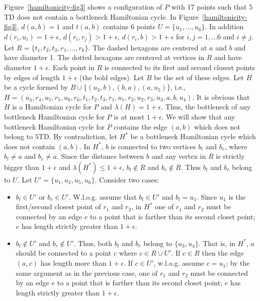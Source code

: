 \documentclass[11pt,a4paper]{article}
\newcommand{\kTD}[2]{$#1$\text{-}TD#2}
\begin{document}
Figure~\ref{hamiltonicity-fig3} shows a configuration of $P$ with 17 points such that \kTD{5}{} does not contain a bottleneck Hamiltonian cycle. In Figure~\ref{hamiltonicity-fig3}, $d(a,b)=1$ and $t(a,b)$ contains 6 points $U=\{u_1, \dots, u_6\}$. In addition $d(r_i, u_i)= 1+\epsilon$, $d(r_i, r_j)>1+\epsilon$, $d(r_i, b)> 1+\epsilon$ for $i,j=1,\dots 6$ and $i\neq j$. Let $R=\{t_1, t_2,t_3, r_1,\dots, r_6\}$. The dashed hexagons are centered at $a$ and $b$ and have diameter 1. The dotted hexagons are centered at vertices in $R$ and have diameter $1+\epsilon$. Each point in $R$ is connected to its first and second closest points by edges of length $1+\epsilon$ (the bold edges). Let $B$ be the set of these edges. Let $H$ be a cycle formed by $B\cup\{(u_3,b),(b,a),(a,u_5)\}$, i.e., $H=(u_4,r_4,u_5,r_5,u_6,r_6,t_1,t_2,t_3,r_1,u_1,r_2,u_2,r_3,u_3,a,b,u_4)$. It is obvious that $H$ is a Hamiltonian cycle for $P$ and $\lambda(H)=1+\epsilon$. Thus, the bottleneck of any bottleneck Hamiltonian cycle for $P$ is at most $1+\epsilon$. We will show that any bottleneck Hamiltonian cycle for $P$ contains the edge $(a,b)$ which does not belong to \kTD{5}{}. By contradiction, let $H^*$ be a bottleneck Hamiltonian cycle which does not contain $(a,b)$. In $H^*$, $b$ is connected to two vertices $b_l$ and $b_r$, where $b_l\neq a$ and $b_r\neq a$. Since the distance between $b$ and any vertex in $R$ is strictly bigger than $1+\epsilon$ and $\lambda(H^*)\le 1+\epsilon$, $b_l\notin R$ and $b_r\notin R$. Thus $b_l$ and $b_r$ belong to $U$. Let $U'=\{u_1,u_2,u_5,u_6\}$. Consider two cases:

\begin{itemize}
 \item $b_l\in U'$ or $b_r\in U'$. W.l.o.g. assume that $b_l\in U'$ and $b_l=u_1$. Since $u_1$ is the first/second closest point of $r_1$ and $r_2$, in $H^*$ one of $r_1$ and $r_2$ must be connected by an edge $e$ to a point that is farther than its second closet point; $e$ has length strictly greater than $1+\epsilon$.
 \item $b_l\notin U'$ and $b_r\notin U'$. Thus, both $b_l$ and $b_r$ belong to $\{u_3,u_4\}$. That is, in $H^*$, $a$ should be connected to a point $c$ where $c\in R\cup U'$. If $c\in R$ then the edge $(a,c)$ has length more than $1+\epsilon$. If $c\in U'$, w.l.o.g. assume $c=u_1$; by the same argument as in the previous case, one of $r_1$ and $r_2$ must be connected by an edge $e$ to a point that is farther than its second closet point; $e$ has length strictly greater than $1+\epsilon$.
\end{itemize}
\end{document}
